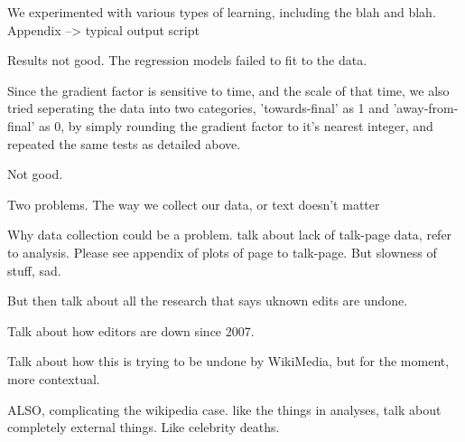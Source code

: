 We experimented with various types of learning, including the blah and
blah. Appendix --> typical  output script

Results not good. The regression models failed to fit to the data.

Since the gradient factor is sensitive to time, and the scale of that
time, we also tried seperating the data into two categories,
'towards-final' as 1 and 'away-from-final' as 0, by simply rounding
the gradient factor to it's nearest integer, and repeated the same
tests as detailed above.

Not good.

Two problems. The way we collect our data, or text doesn't matter

Why data collection could be a problem. talk about lack of talk-page
data, refer to analysis. Please see appendix of plots of page to
talk-page. But slowness of stuff, sad. 

But then talk about all the research that says uknown edits are
undone. 

Talk about how editors are down since 2007.

Talk about how this is trying to be undone by WikiMedia, but for the
moment, more contextual.

ALSO, complicating the wikipedia case. like the things in analyses,
talk about completely external things. Like celebrity deaths.
